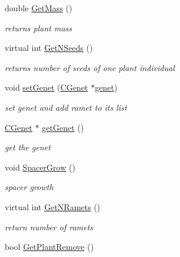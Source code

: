 \begin{DoxyCompactItemize}
\mbox{\label{class_c_plant_a70c98d3af1bfd3095d2dd0e7880597ac}} 
double \mbox{\hyperlink{class_c_plant_a70c98d3af1bfd3095d2dd0e7880597ac}{Get\+Mass}} ()
\begin{DoxyCompactList}\small\item\em returns plant mass \end{DoxyCompactList}\item 
virtual int \mbox{\hyperlink{class_c_plant_a0e6da4d0343dc1cceae34118ca8e2a3f}{Get\+N\+Seeds}} ()
\begin{DoxyCompactList}\small\item\em returns number of seeds of one plant individual \end{DoxyCompactList}\item 
void \mbox{\hyperlink{class_c_plant_a214050cfb40ec3f179633ba29e594ddf}{set\+Genet}} (\mbox{\hyperlink{class_c_genet}{C\+Genet}} $\ast$\mbox{\hyperlink{class_c_plant_acb01afeb25e9427226da1c823f479776}{genet}})
\begin{DoxyCompactList}\small\item\em set genet and add ramet to its list \end{DoxyCompactList}\item 
\mbox{\label{class_c_plant_a16f1ef81fc73af23d8576a386c70637d}} 
\mbox{\hyperlink{class_c_genet}{C\+Genet}} $\ast$ \mbox{\hyperlink{class_c_plant_a16f1ef81fc73af23d8576a386c70637d}{get\+Genet}} ()
\begin{DoxyCompactList}\small\item\em get the genet \end{DoxyCompactList}\item 
void \mbox{\hyperlink{class_c_plant_abc8381f34cb7dd169a60d886ced465be}{Spacer\+Grow}} ()
\begin{DoxyCompactList}\small\item\em spacer growth \end{DoxyCompactList}\item 
virtual int \mbox{\hyperlink{class_c_plant_a4f815871e13536e1e4f78a34e7ed2ef3}{Get\+N\+Ramets}} ()
\begin{DoxyCompactList}\small\item\em return number of ramets \end{DoxyCompactList}\item 
\mbox{\label{class_c_plant_a48f2f4cffe534b07514e3048e0d01db6}} 
bool \mbox{\hyperlink{class_c_plant_a48f2f4cffe534b07514e3048e0d01db6}{Get\+Plant\+Remove}} ()

\end{DoxyCompactItemize}
